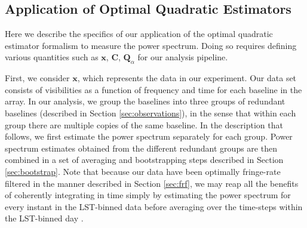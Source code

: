\documentclass[twocolumn,numberedappendix]{emulateapj} \shorttitle{New Limits on the 21 cm Power Spectrum at $z=8.4$}
\newcommand{\x}{\mathbf{x}} \newcommand{\xhat}{\hat{\mathbf{x}}}
\newcommand{\phat}{\hat{\mathbf{p}}}
\newcommand{\qhat}{\hat{\mathbf{q}}}
\begin{document}
%


\subsection{Application of Optimal Quadratic Estimators}
\label{sec:oqe_app}

Here we describe the specifics of our application of the optimal quadratic
estimator formalism to measure the power spectrum. Doing so requires defining
various quantities such as $\x$, $\mathbf{C}$, $\mathbf{Q}_\alpha$ for our analysis
pipeline.

First, we consider $\x$, which represents the data in our experiment.  Our data set consists
of visibilities as a function of frequency and time for each baseline in the
array. In our analysis, we group the baselines into three groups of redundant baselines (described in
Section \ref{sec:observations}), 
in the sense that within each group there are multiple copies of the same baseline. In the
description that follows, we first estimate the power spectrum separately for each group.
Power spectrum estimates obtained from the different redundant groups are then combined in a set of averaging and bootstrapping steps described in Section \ref{sec:bootstrap}. Note that because
our data have been optimally fringe-rate filtered in the manner described in Section \ref{sec:frf},
we may reap all the benefits of coherently integrating in time simply by estimating the power spectrum
for every instant in the LST-binned data before averaging over the time-steps within the LST-binned day \citep{parsons_et_al2015}.
\end{document}
